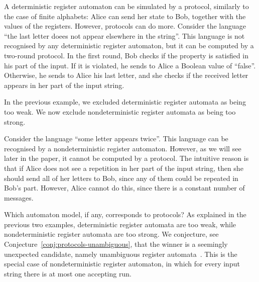 \begin{myexample}\label{ex:last-letter-does-not-appear-before}  A deterministic register automaton can be simulated by a protocol, similarly to the case of finite alphabets: Alice can send her state  to Bob, together with the values of the registers.  However,  protocols can do more. 
    Consider the language ``the last letter doees not appear elsewhere in the string''. This language is not recognised by any deterministic register automaton, but it can be computed by a two-round protocol. In  the first round, Bob checks if the property is satisfied in his part of the input. If it is violated, he sends to Alice a Boolean value of ``false''. Otherwise, he sends to Alice his last letter, and she checks if the received letter appears in her part of the input string. 
\end{myexample}

In the previous example, we  excluded deterministic register automata as being too weak. We now exclude nondeterministic register automata as being too strong. 

\begin{myexample}
    \label{ex:some-twice}
    Consider the language ``some letter appears twice''. This language can be recognised by a nondeterministic register automaton. However, as we will see later in the paper, it cannot be computed by a protocol. The  intuitive reason  is that if Alice does not see a repetition in her part of the input string, then she should send all of her letters to Bob, since any of them could be repeated in Bob's part. However, Alice cannot do this, since there is a constant number of messages. 
\end{myexample}

Which automaton model, if any, corresponds to protocols? As explained in the previous two examples, deterministic register automata are too weak, while nondeterministic register automata are too strong.
We conjecture, see Conjecture~\ref{conj:protocols-unambiguous}, that the winner is a seemingly  unexpected candidate, namely unambiguous register automata~\cite[Section 5]{colcombet2015unambiguity}. This  is the special case of  nondeterministic register automaton, in which  for every  input string there is  at most  one accepting run. 


